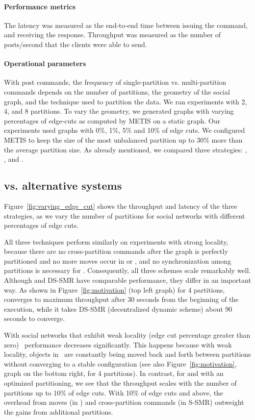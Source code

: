 \paragraph*{Performance metrics}
%
The latency was measured as the end-to-end time between issuing the
command, and receiving the response.  Throughput was measured as the
number of posts/second that the clients were able to send.

\paragraph*{Operational parameters}
%
With post commands, the frequency of single-partition
vs. multi-partition commands depends on the number of partitions, the
geometry of the social graph, and the technique used to partition the
data. We ran experiments with 2, 4, and 8 partitions.  To vary the
geometry, we generated graphs with varying percentages of edge-cuts as
computed by METIS on a static graph. Our experiments used graphs with
0\%, 1\%, 5\% and 10\% of edge cuts. We configured METIS to keep the size of the most unbalanced partition up to 30\% more than the average
partition size.
As already mentioned, we compared 
three strategies: \ssmr{}, \dssmr, and \dynastar.


\subsection{\dynastar vs. alternative systems}
\label{sec:evaluation:results}

Figure~\ref{fig:varying_edge_cut} shows the throughput and latency of the three strategies, as we vary the number of partitions for social networks with different percentages of edge cuts.

All three techniques perform similarly on experiments with
strong locality, because there are no cross-partition commands after
the graph is perfectly partitioned and no more moves occur in
\dynastar or \dssmr, and no synchronization among partitions is
necessary for \ssmr.
Consequently, all three schemes scale remarkably well.
Although \dynastar and DS-SMR have comparable performance, they differ in an important way. 
As shown in Figure~\ref{fig:motivation} (top left graph) for 4 partitions, \dynastar converges to maximum throughput after 30 seconds from the beginning of the execution, while it takes DS-SMR (decentralized dynamic scheme) about 90 seconds to converge.

With social networks that exhibit weak locality (edge cut percentage greater than zero) \dssmr\ performance decreases significantly.  
This happens because with weak locality, objects in \dssmr\ are constantly being moved back and forth between partitions without converging to a stable configuration (see also Figure~\ref{fig:motivation}, graph on the bottom right, for 4 partitions). 
In contrast, for \dynastar and \ssmr with an optimized partitioning, we see that the throughput scales with the number of partitions up to 10\% of edge cuts. 
With 10\% of edge cuts and above, the overhead from moves (in \dynastar) and cross-partition commands (in S-SMR) outweight the gains from additional partitions.

